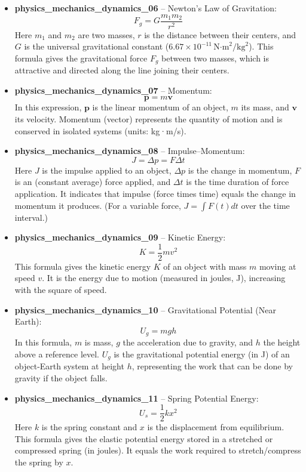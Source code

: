 \documentclass[11pt,a4paper]{article}
\begin{document}
\begin{itemize}
\item \textbf{physics\_mechanics\_dynamics\_06} -- Newton's Law of Gravitation: 
\[F_{g} = G \frac{m_1 m_2}{r^2}\]
Here $m_1$ and $m_2$ are two masses, $r$ is the distance between their centers, and $G$ is the universal gravitational constant ($6.67\times10^{-11}\,\text{N·m}^2/\text{kg}^2$). This formula gives the gravitational force $F_{g}$ between two masses, which is attractive and directed along the line joining their centers.

\item \textbf{physics\_mechanics\_dynamics\_07} -- Momentum: 
\[\mathbf{p} = m\mathbf{v}\]
In this expression, $\mathbf{p}$ is the linear momentum of an object, $m$ its mass, and $\mathbf{v}$ its velocity. Momentum (vector) represents the quantity of motion and is conserved in isolated systems (units: kg·m/s).

\item \textbf{physics\_mechanics\_dynamics\_08} -- Impulse--Momentum: 
\[J = \Delta p = F\Delta t\]
Here $J$ is the impulse applied to an object, $\Delta p$ is the change in momentum, $F$ is an (constant average) force applied, and $\Delta t$ is the time duration of force application. It indicates that impulse (force times time) equals the change in momentum it produces. (For a variable force, $J = \int F(t) dt$ over the time interval.)

\item \textbf{physics\_mechanics\_dynamics\_09} -- Kinetic Energy: 
\[K = \frac{1}{2}mv^2\]
This formula gives the kinetic energy $K$ of an object with mass $m$ moving at speed $v$. It is the energy due to motion (measured in joules, J), increasing with the square of speed.

\item \textbf{physics\_mechanics\_dynamics\_10} -- Gravitational Potential (Near Earth): 
\[U_g = mgh\]
In this formula, $m$ is mass, $g$ the acceleration due to gravity, and $h$ the height above a reference level. $U_g$ is the gravitational potential energy (in J) of an object-Earth system at height $h$, representing the work that can be done by gravity if the object falls.

\item \textbf{physics\_mechanics\_dynamics\_11} -- Spring Potential Energy: 
\[U_s = \frac{1}{2}kx^2\]
Here $k$ is the spring constant and $x$ is the displacement from equilibrium. This formula gives the elastic potential energy stored in a stretched or compressed spring (in joules). It equals the work required to stretch/compress the spring by $x$.


\end{itemize}
\end{document}
